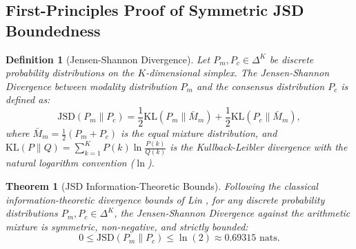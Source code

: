 \documentclass[conference]{IEEEtran}
\newtheorem{theorem}{Theorem}
\newtheorem{definition}{Definition}
\begin{document}
\subsection{First-Principles Proof of Symmetric JSD Boundedness}
\begin{definition}[Jensen-Shannon Divergence]
Let $P_m, P_c \in \Delta^K$ be discrete probability distributions on the $K$-dimensional simplex. The Jensen-Shannon Divergence between modality distribution $P_m$ and the consensus distribution $P_c$ is defined as:
\begin{equation}
\mathrm{JSD}(P_m \parallel P_c) = \frac{1}{2} \mathrm{KL}(P_m \parallel \bar{M}_m) + \frac{1}{2} \mathrm{KL}(P_c \parallel \bar{M}_m),
\end{equation}
where $\bar{M}_m = \frac{1}{2}(P_m + P_c)$ is the equal mixture distribution, and $\mathrm{KL}(P \parallel Q) = \sum_{k=1}^K P(k) \ln \frac{P(k)}{Q(k)}$ is the Kullback-Leibler divergence with the natural logarithm convention ($\ln$).
\end{definition}

\begin{theorem}[JSD Information-Theoretic Bounds]
\label{thm:jsd_bounds}
Following the classical information-theoretic divergence bounds of Lin \cite{lin1991divergence}, for any discrete probability distributions $P_m, P_c \in \Delta^K$, the Jensen-Shannon Divergence against the arithmetic mixture is symmetric, non-negative, and strictly bounded:
\begin{equation}
0 \le \mathrm{JSD}(P_m \parallel P_c) \le \ln(2) \approx 0.69315\text{ nats}.
\end{equation}
\end{theorem}
\end{document}

